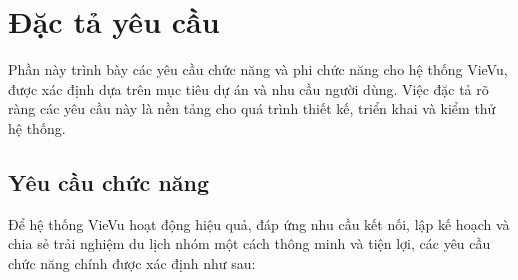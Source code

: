 \section{Đặc tả yêu cầu}
Phần này trình bày các yêu cầu chức năng và phi chức năng cho hệ thống VieVu, được xác định dựa trên mục tiêu dự án và nhu cầu người dùng. Việc đặc tả rõ ràng các yêu cầu này là nền tảng cho quá trình thiết kế, triển khai và kiểm thử hệ thống.
\subsection{Yêu cầu chức năng}

Để hệ thống VieVu hoạt động hiệu quả, đáp ứng nhu cầu kết nối, lập kế hoạch và chia sẻ trải nghiệm du lịch nhóm một cách thông minh và tiện lợi, các yêu cầu chức năng chính được xác định như sau:

